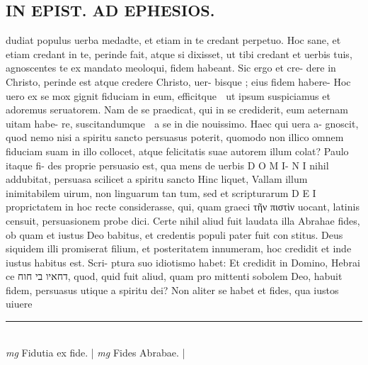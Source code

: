 \documentclass{article}
\begin{document}
\begin{pages}
\section*{IN EPIST. AD EPHESIOS. }\pstart dudiat populus uerba medadte, et etiam in te credant perpetuo. Hoc sane, et etiam credant in te, perinde fait, atque  si dixisset, ut tibi credant et uerbis tuis, agnoscentes te ex mandato meoloqui, fidem habeant. Sic ergo et cre- dere in Christo, perinde est atque credere Christo, uer- bisque ; eius fidem habere-  \pend\pstart Hoc uero ex se mox gignit fiduciam in eum, efficitque  ut ipsum suspiciamus et adoremus seruatorem. Nam de se praedicat, qui in se crediderit, eum aeternam uitam habe- re, suscitandumque  a se in die nouissimo. Haec qui uera a- gnoscit, quod nemo nisi a spiritu sancto persuasus poterit, quomodo non illico omnem fiduciam suam in illo collocet, atque felicitatis suae autorem illum colat? Paulo itaque fi- des proprie persuasio est, qua mens de uerbis D O M I- N I nihil addubitat, persuasa scilicet a spiritu sancto Hinc liquet, Vallam illum inimitabilem uirum, non linguarum tan tum, sed et scripturarum D E I proprictatem in hoc recte considerasse, qui, quam graeci τῆν πιστὶν uocant, latinis censuit, persuasionem probe dici.  \pend\pstart Certe nihil aliud fuit laudata illa Abrahae fides, ob quam et iustus Deo babitus, et credentis populi pater fuit con stitus.  Deus siquidem illi promiserat filium, et posteritatem innumeram, hoc credidit et inde iustus habitus est.  Scri- ptura suo idiotismo habet: Et credidit in Domino, Hebrai ce דחאיו בי חוח, quod, quid fuit aliud, quam pro mittenti sobolem Deo, habuit fidem, persuasus utique a spiritu dei? Non aliter se habet et fides, qua iustos uiuere  \pend
\vspace{0.5cm}\noindent
\vspace{0.2cm}\rule{1cm}{0.2pt}\\ 
\hspace{0.2cm}\textit{mg}
\footnotesize Fidutia ex fide.  
\normalsize| 
\hspace{0.2cm}\textit{mg}
\footnotesize Fides Abrabae.  
\normalsize| 

\end{pages}
\end{document}
